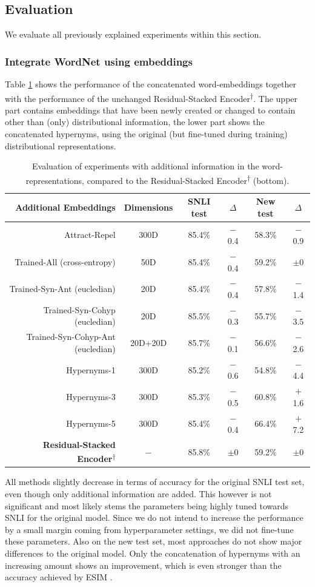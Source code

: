 \subsection{Evaluation}
We evaluate all previously explained experiments within this section.
\subsubsection{Integrate WordNet using embeddings}
Table \ref{tab:eval_embeddings_added} shows the performance of the concatenated word-embeddings together with the performance of the unchanged Residual-Stacked Encoder\textsuperscript{$\dagger$}. The upper part contains embeddings that have been newly created or changed to contain other than (only) distributional information, the lower part shows the concatenated hypernyms, using the original (but fine-tuned during training) distributional representations.
\begin{table}[tph!]
\centering
\begin{tabular}{rc|cc|cc}
\textbf{Additional Embeddings} &\textbf{Dimensions} & \textbf{\ac{SNLI} test} & \textbf{$\Delta$} & \textbf{New test} & \textbf{$\Delta$}\\
\toprule
Attract-Repel \citep{ruckle2018concatenated} & 300D & 85.4\% & $-$0.4 & 58.3\% & $-$0.9 \\
Trained-All (cross-entropy) & 50D & 85.4\% & $-$0.4 & 59.2\% & $\pm$0 \\
Trained-Syn-Ant (eucledian) & 20D & 85.4\% & $-$0.4 &57.8\% & $-$1.4 \\
Trained-Syn-Cohyp (eucledian)& 20D & 85.5\% & $-$0.3 &55.7\% & $-$3.5 \\
Trained-Syn-Cohyp-Ant (eucledian)& 20D+20D & 85.7\% & $-$0.1 & 56.6\% &  $-$2.6 \\
\midrule
Hypernyms-1 & 300D  & 85.2\% & $-$0.6 & 54.8\% & $-$4.4 \\
Hypernyms-3 & 300D  & 85.3\% & $-$0.5 & 60.8\% & $+$1.6 \\
Hypernyms-5 & 300D  & 85.4\% & $-$0.4 & 66.4\% & $+$7.2 \\
\midrule
\textbf{Residual-Stacked Encoder\textsuperscript{$\dagger$}} & $-$ & 85.8\% &$\pm$0 & 59.2\% & $\pm$0\\
\bottomrule
\end{tabular}
\caption{Evaluation of experiments with additional information in the word-representations, compared to the Residual-Stacked Encoder\textsuperscript{$\dagger$} (bottom).}
\label{tab:eval_embeddings_added}
\end{table}
All methods slightly decrease in terms of accuracy for the original \ac{SNLI} test set, even though only additional information are added. This however is not significant and most likely stems the parameters being highly tuned towards \ac{SNLI} for the original model. Since we do not intend to increase the performance by a small margin coming from hyperparameter settings, we did not fine-tune these parameters. Also on the new test set, most approaches do not show major differences to the original model. Only the concatenation of hypernyms with an increasing amount shows an improvement, which is even stronger than the accuracy achieved by \ac{ESIM} \citep{chen2017enhanced}. 
